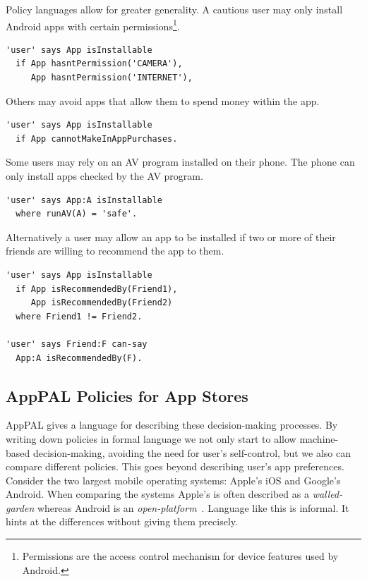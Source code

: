 \documentclass[thesis.tex]{subfiles}
\begin{document}
Policy languages allow for greater generality.  A cautious user may
only install Android apps with certain
permissions\footnote{Permissions are the access control mechanism for
  device features used by Android.}.
\begin{lstlisting}
'user' says App isInstallable
  if App hasntPermission('CAMERA'),
     App hasntPermission('INTERNET'),
\end{lstlisting}
Others may avoid apps that allow them to spend money within the app.
\begin{lstlisting}
'user' says App isInstallable
  if App cannotMakeInAppPurchases.
\end{lstlisting}
Some users may rely on an \ac{AV} program installed on their phone.
The phone can only install apps checked by the \ac{AV} program.
\begin{lstlisting}
'user' says App:A isInstallable
  where runAV(A) = 'safe'.
\end{lstlisting}
Alternatively a user may allow an app to be installed if two or more of their friends are willing to recommend the app to them.
\begin{lstlisting}
'user' says App isInstallable
  if App isRecommendedBy(Friend1),
     App isRecommendedBy(Friend2)
  where Friend1 != Friend2.

'user' says Friend:F can-say
  App:A isRecommendedBy(F).
\end{lstlisting}


\subsection{AppPAL Policies for App Stores}
AppPAL gives a language for describing these decision-making processes. By
writing down policies in formal language we not only start to allow
machine-based decision-making, avoiding the need for user's self-control, but we
also can compare different policies. This goes beyond describing user's app
preferences. Consider the two largest mobile operating systems: Apple's iOS and
Google's Android. When comparing the systems Apple's is often described as a
\emph{walled-garden} whereas Android is an
\emph{open-platform}~\cite{barrera_secure_2011,enck_defending_2011}. Language
like this is informal. It hints at the differences without giving them
precisely.
\end{document}

